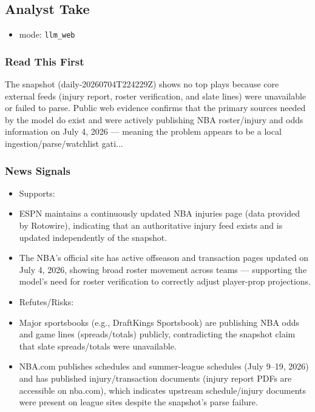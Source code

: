 \documentclass[10pt]{article}
\begin{document}
\newpage

\subsection*{Analyst Take}

\begin{itemize}
\item mode: \texttt{llm\_web}
\end{itemize}

\subsubsection*{Read This First}

The snapshot (daily-20260704T224229Z) shows no top plays because core external feeds (injury report, roster verification, and slate lines) were unavailable or failed to parse. Public web evidence confirms that the primary sources needed by the model do exist and were actively publishing NBA roster/injury and odds information on July 4, 2026 — meaning the problem appears to be a local ingestion/parse/watchlist gati...

\subsubsection*{News Signals}

\begin{itemize}
\item Supports:
\item [S1] ESPN maintains a continuously updated NBA injuries page (data provided by Rotowire), indicating that an authoritative injury feed exists and is updated independently of the snapshot.
\item [S2] The NBA's official site has active offseason and transaction pages updated on July 4, 2026, showing broad roster movement across teams — supporting the model’s need for roster verification to correctly adjust player-prop projections.
\item Refutes/Risks:
\item [S3] Major sportsbooks (e.g., DraftKings Sportsbook) are publishing NBA odds and game lines (spreads/totals) publicly, contradicting the snapshot claim that slate spreads/totals were unavailable.
\item [S4] NBA.com publishes schedules and summer-league schedules (July 9–19, 2026) and has published injury/transaction documents (injury report PDFs are accessible on nba.com), which indicates upstream schedule/injury documents were present on league sites despite the snapshot's parse failure.
\end{itemize}
\end{document}
